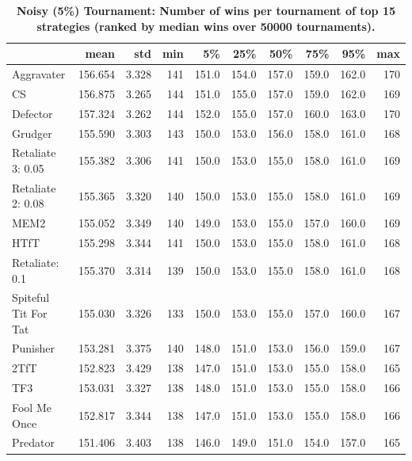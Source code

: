 \documentclass[10pt,letterpaper]{article}
\begin{document}
\begin{table}[!hbtp]
    \centering
        \caption{\bf Noisy (5\%) Tournament: Number of wins per tournament
        of top 15 strategies (ranked by median wins over
        50000 tournaments).}
        \footnotesize
\begin{tabular}{lrrrrrrrrr}
\toprule
{} &     mean &    std &  min &     5\% &    25\% &    50\% &    75\% &    95\% &  max \\
\midrule
Aggravater           &  156.654 &  3.328 &  141 &  151.0 &  154.0 &  157.0 &  159.0 &  162.0 &  170 \\
CS                   &  156.875 &  3.265 &  144 &  151.0 &  155.0 &  157.0 &  159.0 &  162.0 &  169 \\
Defector             &  157.324 &  3.262 &  144 &  152.0 &  155.0 &  157.0 &  160.0 &  163.0 &  170 \\
Grudger              &  155.590 &  3.303 &  143 &  150.0 &  153.0 &  156.0 &  158.0 &  161.0 &  168 \\
Retaliate 3: 0.05    &  155.382 &  3.306 &  141 &  150.0 &  153.0 &  155.0 &  158.0 &  161.0 &  169 \\
Retaliate 2: 0.08    &  155.365 &  3.320 &  140 &  150.0 &  153.0 &  155.0 &  158.0 &  161.0 &  169 \\
MEM2                 &  155.052 &  3.349 &  140 &  149.0 &  153.0 &  155.0 &  157.0 &  160.0 &  169 \\
HTfT                 &  155.298 &  3.344 &  141 &  150.0 &  153.0 &  155.0 &  158.0 &  161.0 &  168 \\
Retaliate: 0.1       &  155.370 &  3.314 &  139 &  150.0 &  153.0 &  155.0 &  158.0 &  161.0 &  168 \\
Spiteful Tit For Tat &  155.030 &  3.326 &  133 &  150.0 &  153.0 &  155.0 &  157.0 &  160.0 &  167 \\
Punisher             &  153.281 &  3.375 &  140 &  148.0 &  151.0 &  153.0 &  156.0 &  159.0 &  167 \\
2TfT                 &  152.823 &  3.429 &  138 &  147.0 &  151.0 &  153.0 &  155.0 &  158.0 &  165 \\
TF3                  &  153.031 &  3.327 &  138 &  148.0 &  151.0 &  153.0 &  155.0 &  158.0 &  166 \\
Fool Me Once         &  152.817 &  3.344 &  138 &  147.0 &  151.0 &  153.0 &  155.0 &  158.0 &  166 \\
Predator             &  151.406 &  3.403 &  138 &  146.0 &  149.0 &  151.0 &  154.0 &  157.0 &  165 \\
\bottomrule
\end{tabular}
        \label{tbl:noisy_wins_top_winners}
\end{table}
\end{document}
